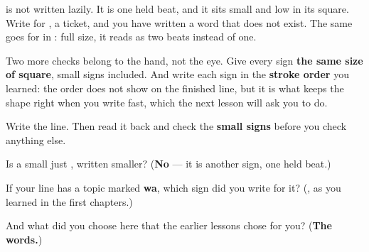 \textbf{} is not \textbf{} written lazily. It is one held beat, and it sits small and low in its square. Write \textbf{} for \textbf{}, a ticket, and you have written a word that does not exist. The same goes for \textbf{} in \textbf{}: full size, it reads as two beats instead of one.

Two more checks belong to the hand, not the eye. Give every sign \textbf{the same size of square}, small signs included. And write each sign in the \textbf{stroke order} you learned: the order does not show on the finished line, but it is what keeps the shape right when you write fast, which the next lesson will ask you to do.

Write the line. Then read it back and check the \textbf{small signs} before you check anything else.

\begin{tcolorbox}[breakable,colback=teal!4,colframe=teal!35!black,title={Before you move on}]
Is a small \textbf{} just \textbf{}, written smaller? (\textbf{No} — it is another sign, one held beat.)

If your line has a topic marked \textbf{wa}, which sign did you write for it? (\textbf{}, as you learned in the first chapters.)

And what did you choose here that the earlier lessons chose for you? (\textbf{The words.})
\end{tcolorbox}

